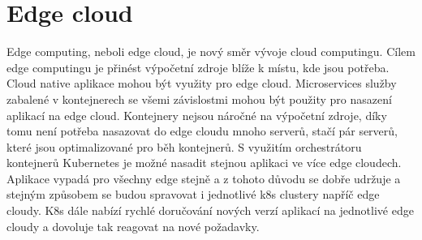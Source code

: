 \section{Edge cloud}
 Edge computing, neboli edge cloud, je nový směr vývoje cloud computingu. Cílem edge computingu je přinést výpočetní zdroje blíže k místu, kde jsou potřeba. Cloud native aplikace mohou být využity pro edge cloud. Microservices služby zabalené v kontejnerech se všemi závislostmi mohou být použity pro nasazení aplikací na edge cloud. Kontejnery nejsou náročné na výpočetní zdroje, díky tomu není potřeba nasazovat do edge cloudu mnoho serverů, stačí pár serverů, které jsou optimalizované pro běh kontejnerů. S využitím orchestrátoru kontejnerů Kubernetes je možné nasadit stejnou aplikaci ve více edge cloudech. Aplikace vypadá pro všechny edge stejně a z tohoto důvodu se dobře udržuje a stejným způsobem se budou spravovat i jednotlivé k8s clustery napříč edge cloudy. K8s dále nabízí rychlé doručování nových verzí aplikací na jednotlivé edge cloudy a dovoluje tak reagovat na nové požadavky.\par
